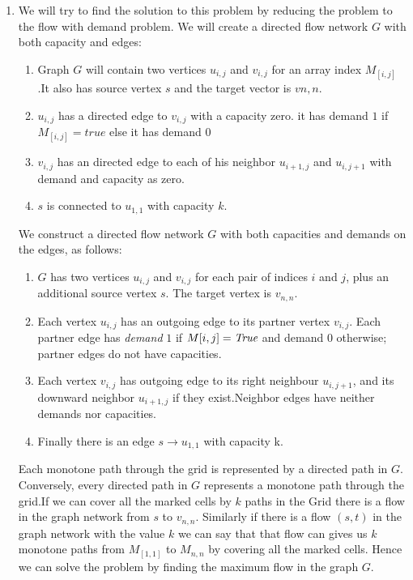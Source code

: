 \documentclass[addpoints]{exam}
\begin{document}
\begin{questions}
\begin{solution}
\begin{enumerate}
\item
We will try to find the solution to this problem by reducing the problem to the flow with demand problem.
We will create a directed flow network $G$ with both capacity and edges:
\begin{enumerate}
\item
Graph $G$ will contain two vertices $u_{i,j}$ and $v_{i,j}$ for an array index $M_{[i,j]}$.It also has source vertex $s$ and the target vector is $v{n,n}$.
\item
$u_{i,j}$ has a directed edge to $v_{i,j}$ with a capacity zero. it has demand $1$ if $M_{[i,j]} = true$
else it has demand $0$
\item
$v_{i,j}$ has an directed edge to each of his neighbor $u_{i+1,j}$ and $u_{i,j+1}$ with demand and capacity as zero.
\item
$s$ is connected to $u_{1,1}$ with capacity $k$.
\end{enumerate}
We construct a directed flow network $G$ with both capacities and demands on the edges, as follows:\\
\begin{enumerate}
\item
$G$ has two vertices $u_{i,j}$ and $v_{i,j}$ for each pair of indices $i$ and $j$, plus an additional source vertex $s$. The target vertex is $v_{n,n}$.
\item
Each vertex $u_{i,j}$ has an outgoing edge to its partner vertex $v_{i,j}$. Each partner edge has \emph{demand} $1$ if $M[i,j] = \emph{True}$ and demand $0$ otherwise; partner edges do not have capacities.
\item
Each vertex $v_{i,j}$ has outgoing edge to its right neighbour $u_{i,j+1}$, and its downward neighbor $u_{i+1,j}$ if they exist.Neighbor edges have neither demands nor capacities.
\item Finally there is an edge $s \rightarrow u_{1,1}$ with capacity k. 
\end{enumerate}

Each monotone path through the grid is represented by a directed path in $G$. Conversely, every directed path in $G$ represents a monotone path through the grid.If we can cover all the marked cells by $k$ paths in the Grid there is a flow in the graph network from $s$ to $v_{n,n}$. Similarly if there is a flow $({s,t})$ in the graph network with the value $k$ we can say that that flow can gives us $k$ monotone paths from $M_{[1,1]}$ to $M_{n,n}$ by covering all the marked cells.
Hence we can solve the problem by finding the maximum flow in the graph $G$.\\


\end{enumerate}
\end{solution}
\end{questions}
\end{document}
